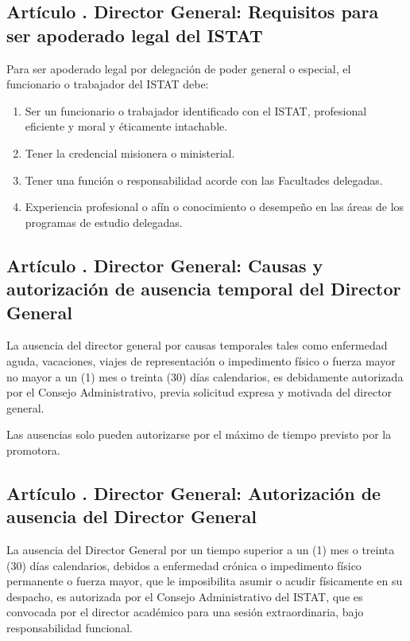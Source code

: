 \subsection{Artículo . Director General: Requisitos para ser apoderado legal del ISTAT}
\addtocounter{ns}{1}
Para ser apoderado legal por delegación de poder general o especial, el funcionario o trabajador del ISTAT debe: 
\begin{enumerate}
\item Ser un funcionario o trabajador identificado con el ISTAT, profesional eficiente y moral y éticamente intachable. 
\item Tener la credencial misionera o ministerial. 
\item Tener una función o responsabilidad acorde con las Facultades delegadas. 
\item Experiencia profesional o afín o conocimiento o desempeño en las áreas de los programas de estudio delegadas. 
\end{enumerate}
\subsection{Artículo . Director General: Causas y autorización de ausencia temporal del Director General}
\addtocounter{ns}{1}
La ausencia del director general por causas temporales tales como enfermedad aguda, vacaciones, viajes de representación o impedimento físico o fuerza mayor no mayor a un (1) mes o treinta (30) días calendarios, es debidamente autorizada por el Consejo Administrativo, previa solicitud expresa y motivada del director general. 

Las ausencias solo pueden autorizarse por el máximo de tiempo previsto por la promotora. 
\subsection{Artículo . Director General: Autorización de ausencia del Director General}
\addtocounter{ns}{1}
La ausencia del Director General por un tiempo superior a un (1) mes o treinta (30) días calendarios, debidos a enfermedad crónica o impedimento físico permanente o fuerza mayor, que le imposibilita asumir o acudir físicamente en su despacho, es autorizada por el Consejo Administrativo del ISTAT, que es convocada por el director académico para una sesión extraordinaria, bajo responsabilidad funcional. 
